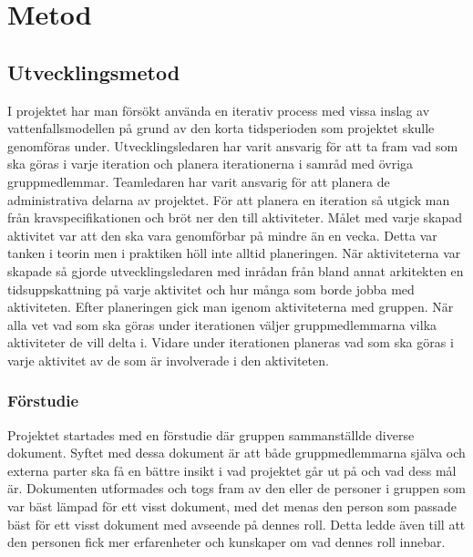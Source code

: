 \chapter{Metod}
\label{cha:method}

\section{Utvecklingsmetod}

I projektet har man försökt använda en iterativ process med vissa inslag av vattenfallsmodellen på grund av den korta tidsperioden som projektet skulle genomföras under. Utvecklingsledaren har varit ansvarig för att ta fram vad som ska göras i varje iteration och planera iterationerna i samråd med övriga gruppmedlemmar. Teamledaren har varit ansvarig för att planera de administrativa delarna av projektet. För att planera en iteration så utgick man från kravspecifikationen och bröt ner den till aktiviteter. Målet med varje skapad aktivitet var att den ska vara genomförbar på mindre än en vecka. Detta var tanken i teorin men i praktiken höll inte alltid planeringen. När aktiviteterna var skapade så gjorde utvecklingsledaren med inrådan från bland annat arkitekten en tidsuppskattning på varje aktivitet och hur många som borde jobba med aktiviteten. Efter planeringen gick man igenom aktiviteterna med gruppen. När alla vet vad som ska göras under iterationen väljer gruppmedlemmarna vilka aktiviteter de vill delta i. Vidare under iterationen planeras vad som ska göras i varje aktivitet av de som är involverade i den aktiviteten.

\subsection{Förstudie}

Projektet startades med en förstudie där gruppen sammanställde diverse dokument. Syftet med dessa dokument är att både gruppmedlemmarna själva och externa parter ska få en bättre insikt i vad projektet går ut på och vad dess mål är. Dokumenten utformades och togs fram av den eller de personer i gruppen som var bäst lämpad för ett visst dokument, med det menas den person som passade bäst för ett visst dokument med avseende på dennes roll. Detta ledde även till att den personen fick mer erfarenheter och kunskaper om vad dennes roll innebar.

